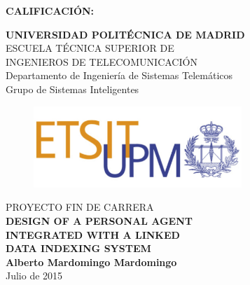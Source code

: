 {\large{\bf CALIFICACIÓN:}}
\pagestyle{empty}
\cleardoublepage
\vspace*{\baselineskip}
\begin{center}
	{\LARGE\rm\textbf{UNIVERSIDAD POLITÉCNICA DE MADRID}\\
	\vspace{1.0cm}
	 ESCUELA TÉCNICA SUPERIOR DE\\ INGENIEROS DE TELECOMUNICACIÓN
	  }  \\

	 {\Large\rm Departamento de Ingeniería de Sistemas Telemáticos\\
	 Grupo de Sistemas Inteligentes  }  \\

\begin{figure}[!htbp]
	\centering
    \includegraphics[width=0.7\textwidth]{img/logos/logo_etsit.jpg}

\end{figure}
	\vspace{1.0cm}
	{{\LARGE\rm PROYECTO FIN DE CARRERA\\
	\vspace{2.0cm}
	 \textbf{DESIGN OF A PERSONAL AGENT}\\	 
	 \textbf{INTEGRATED WITH A LINKED}\\ 
	 \vspace{0.5cm}
	 \textbf{DATA INDEXING SYSTEM} }}  \\
	 
	 \vspace{1.0cm}
     \Large\rm\textbf{Alberto Mardomingo Mardomingo}\\
	 \vspace{1.0cm}
	 Julio de 2015
\end{center}  
